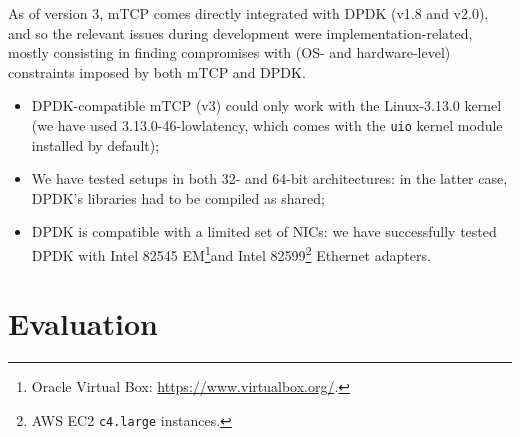 \documentclass[conference]{IEEEtran}
\begin{document}
As of version 3, mTCP comes directly integrated with DPDK (v1.8 and v2.0), and 
so the relevant issues during development were implementation-related, mostly 
consisting in finding compromises with (OS- and hardware-level) constraints 
imposed by both mTCP and DPDK.

\begin{itemize}
	\item DPDK-compatible mTCP (v3) could only work with the Linux-3.13.0 kernel (we have used 
		3.13.0-46-lowlatency, which comes with the \verb+uio+ kernel module installed 
		by default);
	\item We have tested setups in both 32- and 64-bit architectures: in the 
		latter case, DPDK's libraries had to be compiled as shared;
	\item DPDK is compatible with a limited set of NICs: we have successfully 
		tested DPDK with Intel 82545 EM\footnote{Oracle Virtual Box: \url{https://www.virtualbox.org/}.}and Intel 82599\cprotect\footnote{AWS EC2 \verb+c4.large+ instances.} Ethernet adapters.
\end{itemize}

\section{Evaluation}
\label{sec:evaluation}

\end{document}
